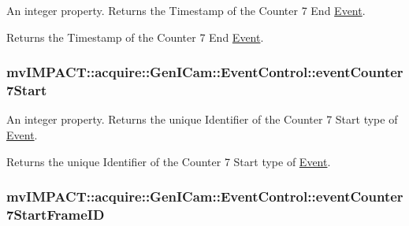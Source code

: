 An integer property. Returns the Timestamp of the Counter 7 End \hyperlink{classmv_i_m_p_a_c_t_1_1acquire_1_1_event}{Event}. 

Returns the Timestamp of the Counter 7 End \hyperlink{classmv_i_m_p_a_c_t_1_1acquire_1_1_event}{Event}. \hypertarget{classmv_i_m_p_a_c_t_1_1acquire_1_1_gen_i_cam_1_1_event_control_a4346846d417dcb71531c9058d87cbf16}{
\subsubsection[{event\+Counter7\+Start}]{ mv\+I\+M\+P\+A\+C\+T\+::acquire\+::\+Gen\+I\+Cam\+::\+Event\+Control\+::event\+Counter7\+Start}}\label{classmv_i_m_p_a_c_t_1_1acquire_1_1_gen_i_cam_1_1_event_control_a4346846d417dcb71531c9058d87cbf16}


An integer property. Returns the unique Identifier of the Counter 7 Start type of \hyperlink{classmv_i_m_p_a_c_t_1_1acquire_1_1_event}{Event}. 

Returns the unique Identifier of the Counter 7 Start type of \hyperlink{classmv_i_m_p_a_c_t_1_1acquire_1_1_event}{Event}. \hypertarget{classmv_i_m_p_a_c_t_1_1acquire_1_1_gen_i_cam_1_1_event_control_acfb4a4f5f62b66069d564b6d3e01be87}{
\subsubsection[{event\+Counter7\+Start\+Frame\+I\+D}]{ mv\+I\+M\+P\+A\+C\+T\+::acquire\+::\+Gen\+I\+Cam\+::\+Event\+Control\+::event\+Counter7\+Start\+Frame\+I\+D}}\label{classmv_i_m_p_a_c_t_1_1acquire_1_1_gen_i_cam_1_1_event_control_acfb4a4f5f62b66069d564b6d3e01be87}



